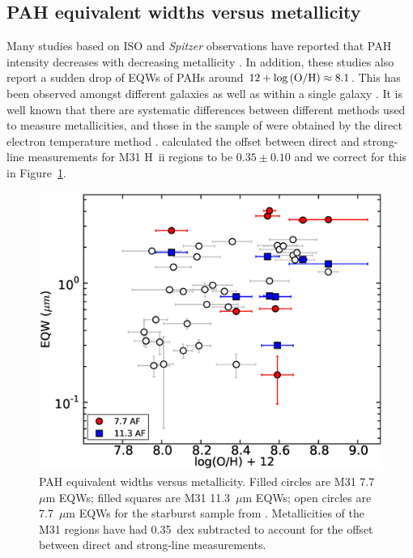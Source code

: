 \subsection{PAH equivalent widths versus metallicity}
\label{sect:eqw_met}

Many studies based on ISO and {\em Spitzer} observations have reported that PAH intensity decreases with decreasing metallicity \citep{Calzetti:2010fk}. 
In addition, these studies also report a sudden drop of EQWs of PAHs around $12+\log{\rm (O/H)} \approx 8.1$. 
This has been observed amongst different galaxies \citep{Engelbracht_2008} as well as within a single galaxy \citep{Gordon:2008lr}. 
 It is well known that there are systematic differences between different 
 methods used to measure metallicities, and those in the sample of \citet{Engelbracht_2008} 
 were obtained by the direct electron temperature method  \citep{Skillman1998}.
\citet{Mitchel2014} calculated the offset between direct and strong-line measurements for M31 H~{\sc ii} regions to be 
$0.35\pm0.10$ and we correct for this in Figure~\ref{metalicityVseqw}.

\begin{figure}
\centering
\includegraphics[scale=0.27]{./fig12.eps}
\caption{ PAH equivalent widths versus metallicity. 
Filled circles are M31 7.7~$\mu$m EQWs; filled squares are M31 11.3~$\mu$m EQWs; 
open circles are 7.7~$\mu$m EQWs for the starburst sample from \citet{Engelbracht_2008}.
Metallicities of the M31 regions have had 0.35~dex subtracted to account for the offset  between direct and strong-line measurements. 
}
\label{metalicityVseqw}
\end{figure}

